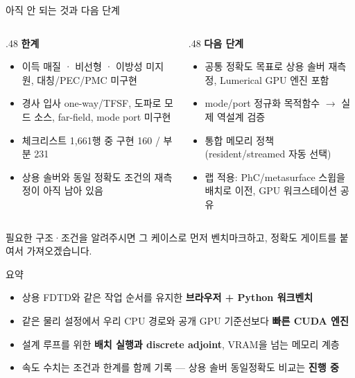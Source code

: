 \documentclass[aspectratio=169,11pt]{beamer}
\begin{document}
\begin{frame}{아직 안 되는 것과 다음 단계}
  \begin{columns}[T]
    \begin{column}{.48\textwidth}
      \textbf{\small 한계}
      \begin{itemize}\footnotesize
        \item 이득 매질 · 비선형 · 이방성 미지원, 대칭/PEC/PMC 미구현
        \item 경사 입사 one-way/TFSF, 도파로 모드 소스, far-field, mode port 미구현
        \item 체크리스트 1,661행 중 구현 160 / 부분 231 
        \item 상용 솔버와 \alert{동일 정확도 조건의 재측정}이 아직 남아 있음
      \end{itemize}
    \end{column}
    \begin{column}{.48\textwidth}
      \textbf{\small 다음 단계}
      \begin{itemize}\footnotesize
        \item 공통 정확도 목표로 상용 솔버 재측정, Lumerical GPU 엔진 포함
        \item mode/port 정규화 목적함수 $\rightarrow$ 실제 역설계 검증
        \item 통합 메모리 정책 (resident/streamed 자동 선택)
        \item 랩 적용: PhC/metasurface 스윕을 배치로 이전, GPU 워크스테이션 공유
      \end{itemize}
    \end{column}
  \end{columns}
  \vspace{2mm}
  \begin{center}
    \small 필요한 구조·조건을 알려주시면 그 케이스로 먼저 벤치마크하고, 정확도 게이트를 붙여서 가져오겠습니다.
  \end{center}
\end{frame}

\begin{frame}[standout]
  요약\\[4mm]
  {\normalsize
  \begin{minipage}{.8\textwidth}
    \begin{itemize}
      \item 상용 FDTD와 같은 작업 순서를 유지한 \textbf{브라우저 + Python 워크벤치}
      \item 같은 물리 설정에서 우리 CPU 경로와 공개 GPU 기준선보다 \textbf{빠른 CUDA 엔진}
      \item 설계 루프를 위한 \textbf{배치 실행과 discrete adjoint}, VRAM을 넘는 메모리 계층
      \item 속도 수치는 조건과 한계를 함께 기록 — 상용 솔버 동일정확도 비교는 \textbf{진행 중}
    \end{itemize}
  \end{minipage}}
\end{frame}
\end{document}
